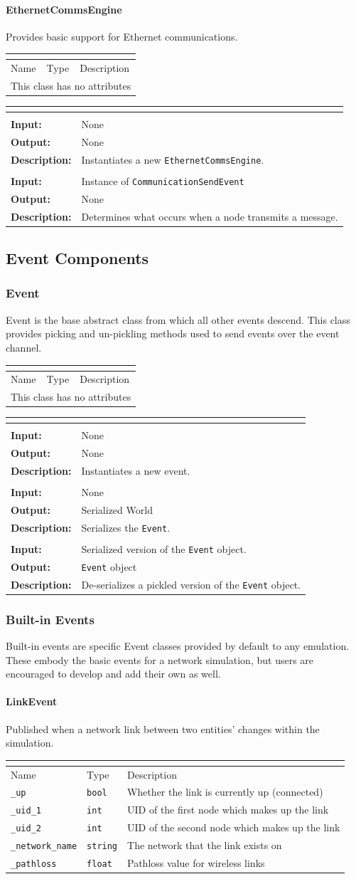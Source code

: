 \documentclass[titlepage]{article}
\newcommand{\operations}[1]{
\begin{center}
    \begin{longtable}{|p{4cm}|p{10cm + 2.0\tabcolsep}|}
    \hline
    \multicolumn{2}{|l|}{\cellcolor[gray]{0.5}{\textbf{Operations}}} \\ \hline
#1
    \end{longtable}
\end{center}
}
\newcommand{\operation}[4]{
    \hline
    \multicolumn{2}{|l|}{\cellcolor[gray]{0.8}{\texttt{#1}}} \\ \hline
    \hspace{7pt}\textbf{Input:} & #2 \\ \hline
    \hspace{7pt}\textbf{Output:} & #3 \\ \hline
    \hspace{7pt}\textbf{Description:} & #4 \\ \hline
}
\newcommand{\noattributes}{
    \begin{center}
        \begin{tabular}{|p{3cm}|p{3cm}|p{8cm}|}
            \multicolumn{3}{|l|}{\cellcolor[gray]{0.5}{\textbf{Attributes}}} \\ \hline
            \rowcolor[gray]{0.8} Name & Type & Description \\ \hline 
            \multicolumn{3}{|c|}{This class has no attributes} \\ \hline
        \end{tabular}
    \end{center}
}
\newcommand{\attributes}[1]{
    \begin{center}
        \begin{tabular}{|p{3.5cm}|p{3.5cm}|p{7cm}|}
            \multicolumn{3}{|l|}{\cellcolor[gray]{0.5}{\textbf{Attributes}}} \\ \hline
            \rowcolor[gray]{0.8} Name & Type & Description \\ \hline 
            #1
        \end{tabular}
    \end{center}
}
\newcommand{\attribute}[3]{
    \texttt{#1} & \texttt{#2} & #3 \\ \hline
}
\begin{document}
\paragraph{EthernetCommsEngine}{Provides basic support for Ethernet communications.}

\noattributes

\operations
{
    \operation{\_\_init\_\_()}{None}{None}{Instantiates a new \texttt{EthernetCommsEngine}.}
    \operation{\_on\_send(event)}{Instance of \texttt{CommunicationSendEvent}}{None}{Determines what occurs when a node transmits a message.}
}

\subsection{Event Components}
\subsubsection{Event}{Event is the base abstract class from which all other events descend.  This class provides picking and un-pickling methods used to send events over the event channel.}

\noattributes

\operations
{
    \operation{\_\_init\_\_()}{None}{None}{Instantiates a new event.}
    \operation{pickle()}{None}{Serialized World}{Serializes the \texttt{Event}.}
    \operation{from\_pickle(pickled)}{Serialized version of the \texttt{Event} object.}{\texttt{Event} object}{De-serializes a pickled version of the \texttt{Event} object.}
}

\subsubsection{Built-in Events}
Built-in events are specific Event classes provided by default to any emulation. These embody the basic events for a network simulation, but users are encouraged to develop and add their own as well.
\paragraph{LinkEvent}{Published when a network link between two entities' changes within the simulation.}

\attributes{
    \attribute{\_up}{bool}{Whether the link is currently up (connected)}
    \attribute{\_uid\_1}{int}{UID of the first node which makes up the link}
    \attribute{\_uid\_2}{int}{UID of the second node which makes up the link}
    \attribute{\_network\_name}{string}{The network that the link exists on}
    \attribute{\_pathloss}{float}{Pathloss value for wireless links}
}
\end{document}

